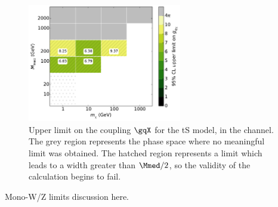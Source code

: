 \begin{figure}[!h]
  \centering
    \includegraphics[width=0.6\textwidth]{figures/grid_basepoints_TSD_rat1_monoWZ.pdf}
    \caption{Upper limit on the coupling $\gqX$ for the tS model, in the \monoWZ channel. The grey region represents the phase space where no meaningful limit was obtained. The hatched region represents a limit which leads to a width greater than $\Mmed / 2$, so the validity of the calculation begins to fail.}
    \label{fig:MonoWZ_TSD_couplinglimit}
\end{figure}

Mono-W/Z limits discussion here.


